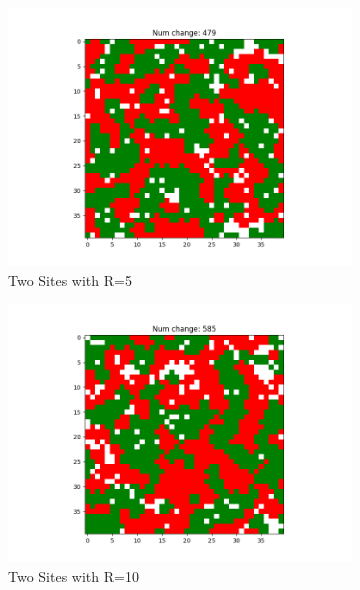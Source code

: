 \documentclass[11pt]{article}
\begin{document}
	\begin{figure}[h]
		\centering
		\begin{subfigure}{0.14\textwidth}
			\includegraphics[width=\linewidth]{policy3_Final_h2r5.png}
			\caption{\centering Two Sites with R=5}
			\label{p3_h2r5}
		\end{subfigure}\hfill
		\begin{subfigure}{0.14\textwidth}
			\includegraphics[width=\linewidth]{policy3_final_h2r10.png}
			\caption{\centering Two Sites with R=10}
		\end{subfigure}\hfill
		\begin{subfigure}{0.14\textwidth}

\end{subfigure}
\end{figure}
\end{document}
